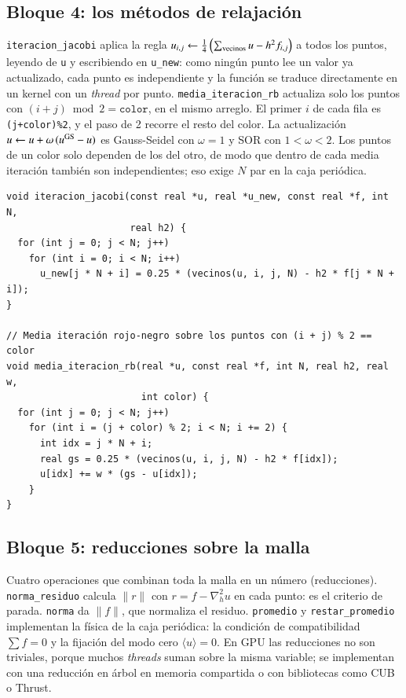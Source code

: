 \begin{appendix}
\subsection{Bloque 4: los métodos de relajación}

\texttt{iteracion\_jacobi} aplica la regla $u_{i,j}\leftarrow\tfrac14\left(\sum_{\rm vecinos}u - h^2 f_{i,j}\right)$ a todos los puntos, leyendo de \texttt{u} y escribiendo en \texttt{u\_new}: como ningún punto lee un valor ya actualizado, cada punto es independiente y la función se traduce directamente en un kernel con un \emph{thread} por punto. \texttt{media\_iteracion\_rb} actualiza solo los puntos con $(i+j)\bmod 2 = \texttt{color}$, en el mismo arreglo. El primer $i$ de cada fila es \texttt{(j+color)\%2}, y el paso de 2 recorre el resto del color. La actualización $u\leftarrow u+\omega\,(u^{\rm GS}-u)$ es Gauss-Seidel con $\omega=1$ y SOR con $1<\omega<2$. Los puntos de un color solo dependen de los del otro, de modo que dentro de cada media iteración también son independientes; eso exige $N$ par en la caja periódica.

\begin{lstlisting}
void iteracion_jacobi(const real *u, real *u_new, const real *f, int N,
                      real h2) {
  for (int j = 0; j < N; j++)
    for (int i = 0; i < N; i++)
      u_new[j * N + i] = 0.25 * (vecinos(u, i, j, N) - h2 * f[j * N + i]);
}

// Media iteración rojo-negro sobre los puntos con (i + j) % 2 == color
void media_iteracion_rb(real *u, const real *f, int N, real h2, real w,
                        int color) {
  for (int j = 0; j < N; j++)
    for (int i = (j + color) % 2; i < N; i += 2) {
      int idx = j * N + i;
      real gs = 0.25 * (vecinos(u, i, j, N) - h2 * f[idx]);
      u[idx] += w * (gs - u[idx]);
    }
}
\end{lstlisting}

\subsection{Bloque 5: reducciones sobre la malla}

Cuatro operaciones que combinan toda la malla en un número (reducciones). \texttt{norma\_residuo} calcula $\|r\|$ con $r=f-\nabla_h^2u$ en cada punto: es el criterio de parada. \texttt{norma} da $\|f\|$, que normaliza el residuo. \texttt{promedio} y \texttt{restar\_promedio} implementan la física de la caja periódica: la condición de compatibilidad $\sum f=0$ y la fijación del modo cero $\langle u\rangle=0$. En GPU las reducciones no son triviales, porque muchos \emph{threads} suman sobre la misma variable; se implementan con una reducción en árbol en memoria compartida o con bibliotecas como CUB o Thrust.


\end{appendix}
